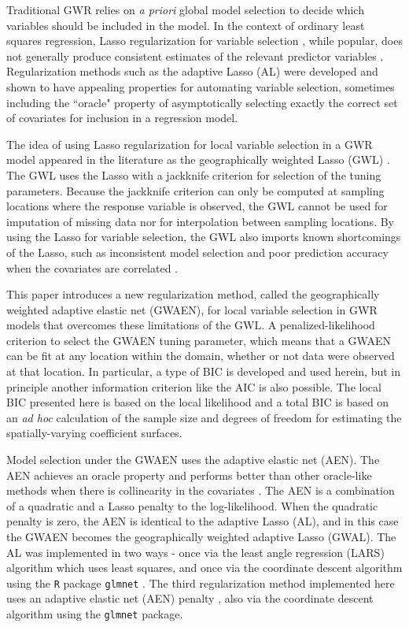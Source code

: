 \documentclass[authoryear, review, 11pt]{elsarticle}
\begin{document}
	Traditional GWR relies on \emph{a priori} global model selection to decide which variables should be included in the model. In the context of ordinary least squares regression, Lasso regularization for variable selection \citep{Tibshirani:1996}, while popular, does not generally produce consistent estimates of the relevant predictor variables \citep{Leng-2006}. Regularization methods such as the adaptive Lasso (AL) \citep{Zou:2006} were developed and shown to have appealing properties for automating variable selection, sometimes including the ``oracle" property of asymptotically selecting exactly the correct set of covariates for inclusion in a regression model.
	
	The idea of using Lasso regularization for local variable selection in a GWR model appeared in the literature as the geographically weighted Lasso (GWL) \citep{Wheeler:2009}. The GWL uses the Lasso with a jackknife criterion for selection of the tuning parameters. Because the jackknife criterion can only be computed at sampling locations where the response variable is observed, the GWL cannot be used for imputation of missing data nor for interpolation between sampling locations. By using the Lasso for variable selection, the GWL also imports known shortcomings of the Lasso, such as inconsistent model selection \citep{Zou:2006, Leng-2006} and poor prediction accuracy when the covariates are correlated \citep{Tibshirani:1996, Zou:2005}. 
	
	This paper introduces a new regularization method, called the geographically weighted adaptive elastic net (GWAEN), for local variable selection in GWR models that overcomes these limitations of the GWL. A penalized-likelihood criterion to select the GWAEN tuning parameter, which means that a GWAEN can be fit at any location within the domain, whether or not data were observed at that location. In particular, a type of BIC is developed and used herein, but in principle another information criterion like the AIC is also possible. The local BIC presented here is based on the local likelihood \citep{Loader:1999} and a total BIC is based on an \emph{ad hoc} calculation of the sample size and degrees of freedom for estimating the spatially-varying coefficient surfaces.
	
	Model selection under the GWAEN uses the adaptive elastic net (AEN). The AEN achieves an oracle property and performs better than other oracle-like methods when there is collinearity in the covariates \citep{Zou:2009}. The AEN is a combination of a quadratic and a Lasso penalty to the log-likelihood. When the quadratic penalty is zero, the AEN is identical to the adaptive Lasso (AL), and in this case the GWAEN becomes the geographically weighted adaptive Lasso (GWAL). The AL was implemented in two ways - once via the least angle regression (LARS) algorithm \citep{Efron:2004b} which uses least squares, and once via the coordinate descent algorithm using the {\tt R} package {\tt glmnet} \citep{Friedman:2010}. The third regularization method implemented here uses an adaptive elastic net (AEN) penalty \citep{Zou:2009}, also via the coordinate descent algorithm using the {\tt glmnet} package.
	
\end{document}
